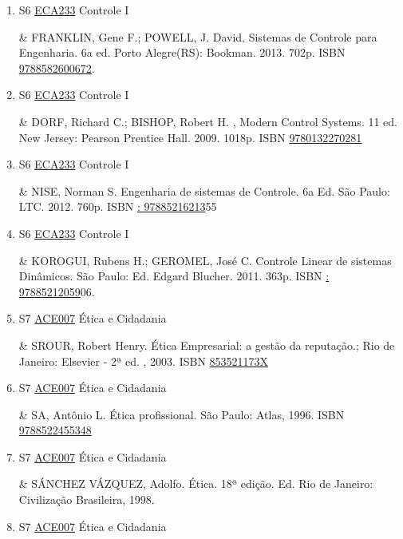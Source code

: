 \documentclass[12pt,a4paper]{book}
\begin{document}
\begin{enumerate}
 \item S6 \hyperref[PUD:ECA233]{ECA233} Controle I

&  FRANKLIN, Gene F.;  POWELL, J.  David.  Sistemas de Controle para Engenharia.  6a ed.  Porto Alegre(RS): Bookman.  2013.  702p.  ISBN \href{http://www.bn.br/site/pages/servicosProfissionais/agenciaISBN/isbnBusca/FbnBuscaISBNCatalogo.asp?pField=ISBN&pIntPagina=1&pISBN=82600672&nidbISBN=true&hidbISBN=true}{9788582600672}.
 \item S6 \hyperref[PUD:ECA233]{ECA233} Controle I

&  DORF, Richard C.;  BISHOP, Robert H. , Modern Control Systems.  11 ed.  New Jersey: Pearson Prentice Hall.  2009.  1018p.  ISBN \href{http://www.isbnsearch.org/isbn/9780132270281}{9780132270281}
 

 \item S6 \hyperref[PUD:ECA233]{ECA233} Controle I

&  NISE, Norman S.  Engenharia de sistemas de Controle.  6a Ed.  São Paulo: LTC.  2012.  760p.  ISBN \href{http://www.google.com/search?hl=pt-BR&tbo=p&tbm=bks&q=isbn:: 97885216213&num=10}{: 97885216213}55
 

 \item S6 \hyperref[PUD:ECA233]{ECA233} Controle I

&  KOROGUI, Rubens H.;  GEROMEL, José C.  Controle Linear de sistemas Dinâmicos. São Paulo: Ed. Edgard Blucher.  2011.  363p.  ISBN \href{http://www.google.com/search?hl=pt-BR&tbo=p&tbm=bks&q=isbn:: 97885212059&num=10}{: 97885212059}06.
 \item S7 \hyperref[PUD:ACE007]{ACE007} Ética e Cidadania

&   SROUR, Robert Henry.   Ética Empresarial: a gestão da reputação.;  Rio de Janeiro: Elsevier - 2ª ed. , 2003.  ISBN 
\href{http://www.google.com/search?hl=pt-BR&tbo=p&tbm=bks&q=isbn:853521173X&num=10}{853521173X}
 

 \item S7 \hyperref[PUD:ACE007]{ACE007} Ética e Cidadania

&   SA, Antônio L.  Ética profissional.  São Paulo: Atlas, 1996.  ISBN \href{http://www.bn.br/site/pages/servicosProfissionais/agenciaISBN/isbnBusca/FbnBuscaISBNCatalogo.asp?pField=ISBN&pIntPagina=1&pISBN=22455348&nidbISBN=true&hidbISBN=true}{9788522455348}
 

 \item S7 \hyperref[PUD:ACE007]{ACE007} Ética e Cidadania

&   SÁNCHEZ VÁZQUEZ, Adolfo.   Ética.  18ª edição.  Ed.  Rio de Janeiro: Civilização Brasileira, 1998.
 \item S7 \hyperref[PUD:ACE007]{ACE007} Ética e Cidadania


\end{enumerate}
\end{document}
